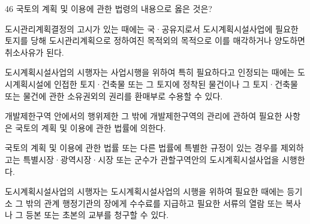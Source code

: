 \begin{question}{46}
국토의 계획 및 이용에 관한 법령의 내용으로 옳은 것은?
\begin{choices}
  \item 도시관리계획결정의 고시가 있는 때에는 국·공유지로서 도시계획시설사업에 필요한 토지를 당해 도시관리계획으로 정하여진 목적외의 목적으로 이를 매각하거나 양도하면 취소사유가 된다.
  \item 도시계획시설사업의 시행자는 사업시행을 위하여 특히 필요하다고 인정되는 때에는 도시계획시설에 인접한 토지·건축물 또는 그 토지에 정착된 물건이나 그 토지·건축물 또는 물건에 관한 소유권외의 권리를 환매부로 수용할 수 있다.
  \item 개발제한구역 안에서의 행위제한 그 밖에 개발제한구역의 관리에 관하여 필요한 사항은 국토의 계획 및 이용에 관한 법률에 의한다.
  \item 국토의 계획 및 이용에 관한 법률 또는 다른 법률에 특별한 규정이 있는 경우를 제외하고는 특별시장·광역시장·시장 또는 군수가 관할구역안의 도시계획시설사업을 시행한다.
  \item 도시계획시설사업의 시행자는 도시계획시설사업의 시행을 위하여 필요한 때에는 등기소 그 밖의 관계 행정기관의 장에게 수수료를 지급하고 필요한 서류의 열람 또는 복사나 그 등본 또는 초본의 교부를 청구할 수 있다.
\end{choices}
\end{question}
